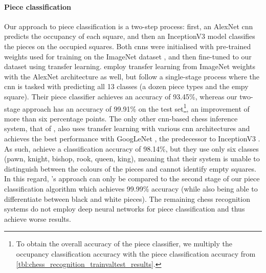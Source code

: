 \documentclass[../main.tex]{subfiles}
\begin{document}
\paragraph{Piece classification}
Our approach to piece classification is a two-step process:
first, an AlexNet \cite{krizhevsky2017} \gls{cnn} predicts the occupancy of each square, and then an InceptionV3 \cite{szegedy2016} model classifies the pieces on the occupied squares. 
Both \glspl{cnn} were initialised with pre-trained weights used for training on the ImageNet dataset \cite{deng2009}, and then fine-tuned to our dataset using transfer learning.
\Textcite{mehta2020} employ transfer learning from ImageNet weights with the AlexNet architecture as well, but follow a single-stage process where the \gls{cnn} is tasked with predicting all 13 classes (a dozen piece types and the empy square).
Their piece classifier achieves an accuracy of 93.45\%, whereas our two-stage approach has an accuracy of 99.91\% on the test set\footnote{
    To obtain the overall accuracy of the piece classifier, we multiply the occupancy classification accuracy with the piece classification accuracy from \cref{tbl:chess_recognition_trainvaltest_results}.
}, an improvement of more than six percentage points.
The only other \gls{cnn}-based chess inference system, that of \textcite{xie2018}, also uses transfer learning with various \gls{cnn} architectures and achieves the best performance with GoogLeNet \cite{szegedy2015}, the predecessor to InceptionV3 \cite{szegedy2016}.
As such, \citeauthor{xie2018} achieve a classification accuracy of 98.14\%, but they use only six classes (pawn, knight, bishop, rook, queen, king), meaning that their system is unable to distinguish between the colours of the pieces and cannot identify empty squares.
In this regard, \citeauthor{xie2018}'s approach can only be compared to the second stage of our piece classification algorithm which achieves 99.99\% accuracy (while also being able to differentiate between black and white pieces).
The remaining chess recognition systems do not employ deep neural networks for piece classification and thus achieve worse results.
\end{document}
